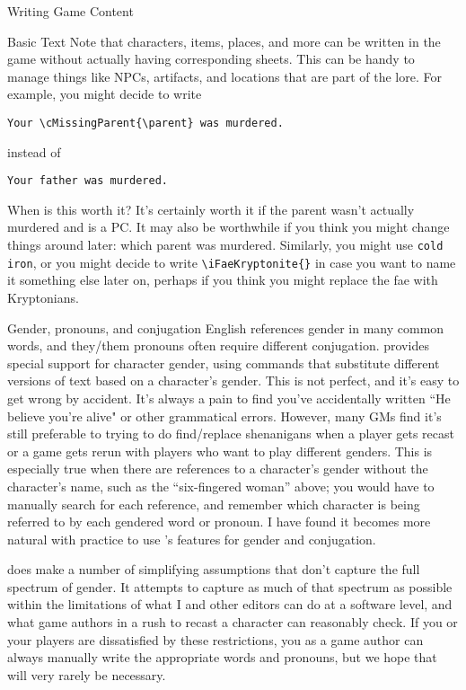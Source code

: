 \documentclass[sheet]{GameTexBase}
\begin{document}
\begin{section}{Writing Game Content}
\begin{subsection}{Basic \gametex{} Text}
Note that characters, items, places, and more can be written in the game without actually having corresponding sheets.  This can be handy to manage things like NPCs, artifacts, and locations that are part of the lore.  For example, you might decide to write 
\begin{verbatim}
Your \cMissingParent{\parent} was murdered.
\end{verbatim}
instead of 
\begin{verbatim}
Your father was murdered.
\end{verbatim}

When is this worth it?  It's certainly worth it if the parent wasn't actually murdered and is a PC.  It may also be worthwhile if you think you might change things around later: which parent was murdered.  Similarly, you might use \lstinline|cold iron|, or you might decide to write \lstinline|\iFaeKryptonite{}| in case you want to name it something else later on, perhaps if you think you might replace the fae with Kryptonians.
\end{subsection}
\begin{subsection}{Gender, pronouns, and conjugation}
\label{gender}
English references gender in many common words, and they/them pronouns often require different conjugation.  \gametex{} provides special support for character gender, using commands that substitute different versions of text based on a character's gender.  This is not perfect, and it's easy to get wrong by accident.  It's always a pain to find you've accidentally written ``He believe you're alive" or other grammatical errors.  However, many GMs find it's still preferable to trying to do find/replace shenanigans when a player gets recast or a game gets rerun with players who want to play different genders.  This is especially true when there are references to a character's gender without the character's name, such as the ``six-fingered woman'' above; you would have to manually search for each reference, and remember which character is being referred to by each gendered word or pronoun.  I have found it becomes more natural with practice to use \gametex{}'s features for gender and conjugation.

\gametex{} does make a number of simplifying assumptions that don't capture the full spectrum of gender.  It attempts to capture as much of that spectrum as possible within the limitations of what I and other \gametex{} editors can do at a software level, and what game authors in a rush to recast a character can reasonably check.  If you or your players are dissatisfied by these restrictions, you as a game author can always manually write the appropriate words and pronouns, but we hope that will very rarely be necessary.


\end{subsection}
\end{section}
\end{document}
